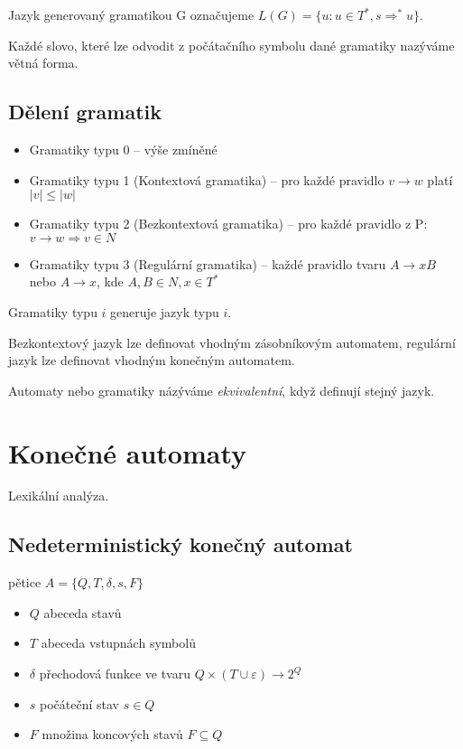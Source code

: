 \documentclass[a4paper, 11pt]{report}
\begin{document}
Jazyk generovaný gramatikou G označujeme $L(G) = \{u: u \in T^*, s \Rightarrow^* u\}$.

Každé slovo, které lze odvodit z počátačního symbolu dané gramatiky nazýváme větná forma.

\subsection{Dělení gramatik}

\begin{itemize}
	\item Gramatiky typu 0 -- výše zmíněné
	\item Gramatiky typu 1 (Kontextová gramatika) -- pro každé pravidlo $v \to w$ platí $|v| \leq |w|$
	\item Gramatiky typu 2 (Bezkontextová gramatika) -- pro každé pravidlo z P: $v \to w \Rightarrow v \in N$
	\item Gramatiky typu 3 (Regulární gramatika) -- každé pravidlo tvaru $A \to xB$ nebo $A \to x$, kde $A,B \in N, x \in T^*$
\end{itemize}

Gramatiky typu $i$ generuje jazyk typu $i$.

Bezkontextový jazyk lze definovat vhodným zásobníkovým automatem, regulární jazyk lze definovat vhodným konečným automatem.

Automaty nebo gramatiky názýváme \emph{ekvivalentní}, když definují stejný jazyk.

\section{Konečné automaty}

Lexikální analýza.

\subsection{Nedeterministický konečný automat}
pětice $A = \{Q, T, \delta, s, F\}$
\begin{itemize}
	\item $Q$ abeceda stavů
	\item $T$ abeceda vstupnách symbolů
	\item $\delta$ přechodová funkce ve tvaru $Q \times (T \cup \varepsilon) \to 2^Q$
	\item $s$ počáteční stav $s \in Q$
	\item $F$ množina koncových stavů $F \subseteq Q$
\end{itemize}
\end{document}
